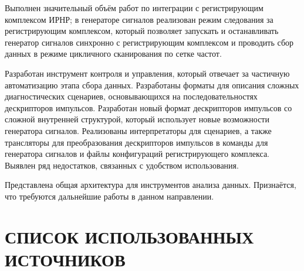 \documentclass{report}
\begin{document}
Выполнен значительный объём работ по интеграции с регистрирующим комплексом ИРНР; в генераторе сигналов реализован режим следования за регистрирующим комплексом, который позволяет запускать и останавливать генератор сигналов синхронно с регистрирующим комплексом и проводить сбор данных в режиме цикличного сканирования по сетке частот.

Разработан инструмент контроля и управления, который отвечает за частичную автоматизацию этапа сбора данных. Разработаны форматы для описания сложных диагностических сценариев, основывающихся на последовательностях дескрипторов импульсов. Разработан новый формат дескрипторов импульсов со сложной внутренней структурой, который использует новые возможности генератора сигналов. Реализованы интерпретаторы для сценариев, а также трансляторы для преобразования дескрипторов импульсов в команды для генератора сигналов и файлы конфигураций регистрирующего комплекса. Выявлен ряд недостатков, связанных с удобством использования.

Представлена общая архитектура для инструментов анализа данных. Признаётся, что требуются дальнейшие работы в данном направлении.

\chapter*{СПИСОК ИСПОЛЬЗОВАННЫХ ИСТОЧНИКОВ}
\end{document}
